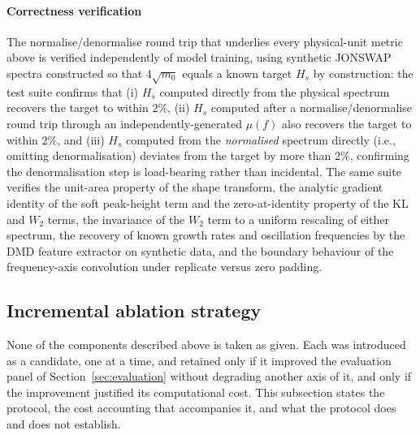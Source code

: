 \paragraph{Correctness verification}
The normalise/denormalise round trip that underlies every physical-unit
metric above is verified independently of model training, using synthetic
JONSWAP spectra constructed so that $4\sqrt{m_0}$ equals a known target
$H_s$ by construction: the test suite confirms that (i) $H_s$ computed
directly from the physical spectrum recovers the target to within 2\%,
(ii) $H_s$ computed after a normalise/denormalise round trip through an
independently-generated $\mu(f)$ also recovers the target to within 2\%,
and (iii) $H_s$ computed from the \emph{normalised} spectrum directly
(i.e., omitting denormalisation) deviates from the target by more than 2\%,
confirming the denormalisation step is load-bearing rather than
incidental. The same suite verifies the unit-area property of the shape
transform, the analytic gradient identity of the soft peak-height term and
the zero-at-identity property of the KL and $W_2$ terms, the invariance of
the $W_2$ term to a uniform rescaling of either spectrum, the recovery of
known growth rates and oscillation frequencies by the DMD feature extractor
on synthetic data, and the boundary behaviour of the frequency-axis
convolution under replicate versus zero padding.

\subsection{Incremental ablation strategy}
\label{sec:ablation}

None of the components described above is taken as given. Each was introduced as a candidate, one at a time, and retained only if it improved the evaluation panel of Section~\ref{sec:evaluation} without degrading another axis of it, and only if the improvement justified its computational cost. This subsection states the protocol, the cost accounting that accompanies it, and what the protocol does and does not establish.

